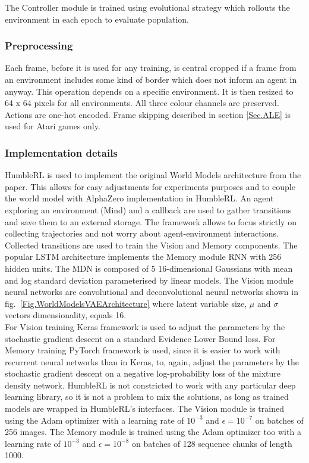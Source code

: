 The Controller module is trained using evolutional strategy which rollouts the environment in each epoch to evaluate population.

\subsubsection{Preprocessing}

Each frame, before it is used for any training, is central cropped if a frame from an environment includes some kind of border which does not inform an agent in anyway. This operation depends on a specific environment. It is then resized to 64 x 64 pixels for all environments. All three colour channels are preserved. Actions are one-hot encoded. Frame skipping described in section \ref{Sec.ALE} is used for Atari games only.

\subsubsection{Implementation details}

HumbleRL is used to implement the original World Models architecture from the paper. This allows for easy adjustments for experiments purposes and to couple the world model with AlphaZero implementation in HumbleRL. An agent exploring an environment (Mind) and a callback are used to gather transitions and save them to an external storage. The framework allows to focus strictly on collecting trajectories and not worry about agent-environment interactions. \\
Collected transitions are used to train the Vision and Memory components. The popular LSTM architecture \cite{Algo.LSTM} implements the Memory module RNN with 256 hidden units. The MDN is composed of 5 16-dimensional Gaussians with mean and log standard deviation parameterised by linear models. The Vision module neural networks are convolutional and deconvolutional neural networks shown in fig.~\ref{Fig.WorldModelsVAEArchitecture} where latent variable size, $\mu$ and $\sigma$ vectors dimensionality, equals 16. \\
For Vision training Keras \cite{Code.Keras} framework is used to adjust the parameters by the stochastic gradient descent on a standard Evidence Lower Bound loss. For Memory training PyTorch \cite{Code.PyTorch} framework is used, since it is easier to work with recurrent neural networks than in Keras, to, again, adjust the parameters by the stochastic gradient descent on a negative log-probability loss of the mixture density network. HumbleRL is not constricted to work with any particular deep learning library, so it is not a problem to mix the solutions, as long as trained models are wrapped in HumbleRL's interfaces.
The Vision module is trained using the Adam optimizer \cite{Algo.Adam} with a learning rate of $10^{-3}$ and $\epsilon = 10^{−7}$ on batches of 256 images. The Memory module is trained using the Adam optimizer \cite{Algo.Adam} too with a learning rate of $10^{-3}$ and $\epsilon = 10^{−8}$ on batches of 128 sequence chunks of length 1000.

